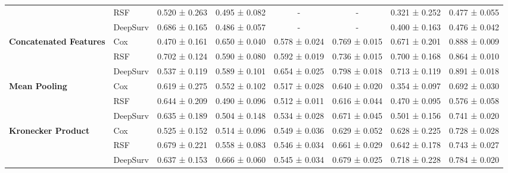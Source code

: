 \begin{sidewaystable}[htbp]
\begin{tabular}{@{}llcccccc@{}}
        & RSF & 0.520 ± 0.263 & 0.495 ± 0.082 & - & - & 0.321 ± 0.252 & 0.477 ± 0.055 \\
        & DeepSurv & 0.686 ± 0.165 & 0.486 ± 0.057 & - & - & 0.400 ± 0.163 & 0.476 ± 0.042 \\
        \midrule
        \multirow{3}{*}{\textbf{Concatenated Features}} & Cox & 0.470 ± 0.161 & 0.650 ± 0.040 & 0.578 ± 0.024 & 0.769 ± 0.015 & 0.671 ± 0.201 & 0.888 ± 0.009 \\
        & RSF & 0.702 ± 0.124 & 0.590 ± 0.080 & 0.592 ± 0.019 & 0.736 ± 0.015 & 0.700 ± 0.168 & 0.864 ± 0.010 \\
        & DeepSurv & 0.537 ± 0.119 & 0.589 ± 0.101 & 0.654 ± 0.025 & 0.798 ± 0.018 & 0.713 ± 0.119 & 0.891 ± 0.018 \\
        \midrule
        \multirow{3}{*}{\textbf{Mean Pooling}} & Cox & 0.619 ± 0.275 & 0.552 ± 0.102 & 0.517 ± 0.028 & 0.640 ± 0.020 & 0.354 ± 0.097 & 0.692 ± 0.030 \\
        & RSF & 0.644 ± 0.209 & 0.490 ± 0.096 & 0.512 ± 0.011 & 0.616 ± 0.044 & 0.470 ± 0.095 & 0.576 ± 0.058 \\
        & DeepSurv & 0.635 ± 0.189 & 0.504 ± 0.148 & 0.534 ± 0.028 & 0.671 ± 0.045 & 0.501 ± 0.156 & 0.741 ± 0.020 \\
        \midrule
        \multirow{3}{*}{\textbf{Kronecker Product}} & Cox & 0.525 ± 0.152 & 0.514 ± 0.096 & 0.549 ± 0.036 & 0.629 ± 0.052 & 0.628 ± 0.225 & 0.728 ± 0.028 \\
        & RSF & 0.679 ± 0.221 & 0.558 ± 0.083 & 0.546 ± 0.034 & 0.661 ± 0.029 & 0.642 ± 0.178 & 0.743 ± 0.027 \\
        & DeepSurv & 0.637 ± 0.153 & 0.666 ± 0.060 & 0.545 ± 0.034 & 0.679 ± 0.025 & 0.718 ± 0.228 & 0.784 ± 0.020 \\
        \bottomrule
    \end{tabular}
\end{sidewaystable}